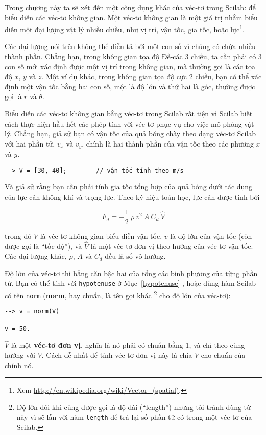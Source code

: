 \documentclass[12pt]{book}
\begin{document}
Trong chương này ta sẽ xét đến một công dụng khác của véc-tơ trong Scilab:
để biểu diễn các véc-tơ không gian. Một véc-tơ không gian là một giá trị nhằm 
biểu diễn một đại lượng vật lý nhiều chiều, như vị trí, vận tốc, gia tốc, hoặc 
lực\footnote{Xem
\url{http://en.wikipedia.org/wiki/Vector_(spatial)}.}.

Các đại lượng nói trên không thể diễn tả bởi một con số vì chúng có chứa 
nhiều thành phần. Chẳng hạn, trong không gian tọa độ Đề-các 3 chiều, ta cần 
phải có 3 con số mới xác định được một vị trí trong không gian, mà thường 
gọi là các tọa độ $x$, $y$ và $z$.  Một ví dụ khác, trong không gian tọa độ 
cực 2 chiều, bạn có thể xác định một vận tốc bằng hai con số, một là độ lớn 
và thứ hai là góc, thường được gọi là $r$ và $\theta$.

Biểu diễn các véc-tơ không gian bằng véc-tơ trong Scilab rất tiện vì 
Scilab biết cách thực hiện hầu hết các phép tính với véc-tơ phục vụ 
cho việc mô phỏng vật lý. Chẳng hạn, giả sử bạn có vận tốc của quả 
bóng chày theo dạng véc-tơ Scilab với hai phần tử, $v_x$ và $v_y$,
chính là hai thành phần của vận tốc theo các phương $x$ và  $y$.

\begin{verbatim}
--> V = [30, 40];        // vận tốc tính theo m/s
\end{verbatim}
%
Và giả sử rằng bạn cần phải tính gia tốc tổng hợp của quả bóng dưới tác 
dụng của lực cản không khí và trọng lực. Theo ký hiệu toán học, lực cản 
được tính bởi 

\[ F_d = -\frac{1}{2} ~ \rho ~ v^2 ~ A ~ C_d ~ \hat{V}   \]

trong đó  $V$ là véc-tơ không gian biểu diễn vận tốc, $v$ là độ lớn của 
vận tốc (còn được gọi là  ``tốc độ''), và $\hat{V}$ là một véc-tơ đơn vị 
theo hướng của véc-tơ vận tốc. Các đại lượng khác, $\rho$, $A$ và  $C_d$
đều là số vô hướng.

Độ lớn của véc-tơ thì bằng căn bậc hai của tổng các bình phương 
của từng phần tử. Bạn có thể tính với {\tt hypotenuse} ở Mục~\ref{hypotenuse} , 
hoặc dùng hàm Scilab có tên {\tt norm} ({\bf norm}, hay chuẩn, là 
tên gọi khác \footnote{Độ lớn đôi khi cũng được gọi là độ dài 
(``length'') nhưng tôi tránh dùng từ này vì sẽ lẫn với hàm 
{\tt length} để trả lại số phần tử có trong một véc-tơ của Scilab.}  cho độ lớn của véc-tơ):

\begin{verbatim}
--> v = norm(V)

v = 50.
\end{verbatim}
%
$\hat{V}$ là một {\bf véc-tơ đơn vị}, nghĩa là nó phải có chuẩn bằng 1,
và  chỉ theo cùng hướng với $V$.  Cách dễ nhất để tính véc-tơ đơn vị này là chia 
$V$ cho chuẩn của chính nó.
\end{document}

